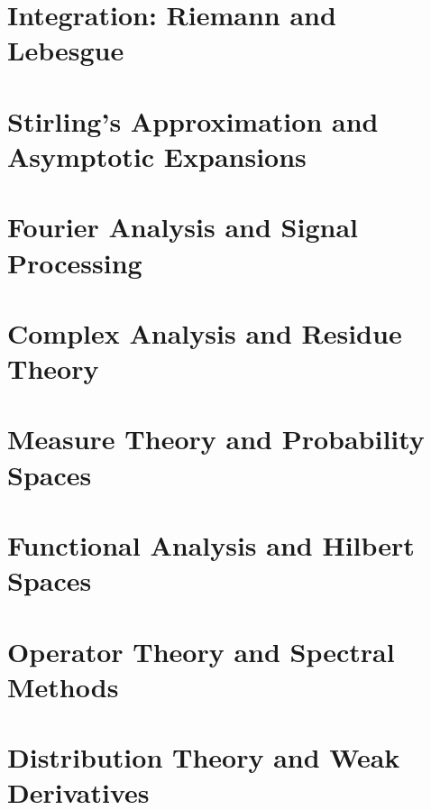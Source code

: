 \chapter{Integration: Riemann and Lebesgue}
\chapter{Stirling's Approximation and Asymptotic Expansions}
\chapter{Fourier Analysis and Signal Processing}
\chapter{Complex Analysis and Residue Theory}
\chapter{Measure Theory and Probability Spaces}
\chapter{Functional Analysis and Hilbert Spaces}
\chapter{Operator Theory and Spectral Methods}
\chapter{Distribution Theory and Weak Derivatives}